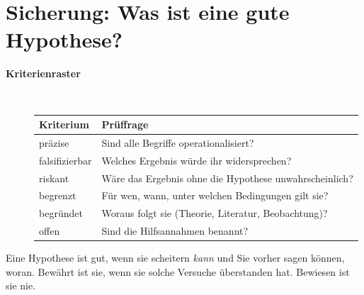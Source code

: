 \section{Sicherung: Was ist eine gute Hypothese?}
\begin{description}
\item[{\rot\bf Kriterienraster}]~\\[-\lblskip]
\begin{center}
\renewcommand{\arraystretch}{1.2}
\begin{tabular}{p{}p{}}
\toprule
\textbf{Kriterium} & \textbf{Prüffrage} \\
\midrule
präzise & Sind alle Begriffe operationalisiert? \\
falsifizierbar & Welches Ergebnis würde ihr widersprechen? \\
riskant & Wäre das Ergebnis ohne die Hypothese unwahrscheinlich? \\
begrenzt & Für wen, wann, unter welchen Bedingungen gilt sie? \\
begründet & Woraus folgt sie (Theorie, Literatur, Beobachtung)? \\
offen & Sind die Hilfsannahmen benannt? \\
\bottomrule
\end{tabular}
\end{center}
\os{\newpage}
\end{description}

\begin{merkbox}
Eine Hypothese ist gut, wenn sie scheitern \emph{kann} und Sie vorher
sagen können, woran. Bewährt ist sie, wenn sie solche Versuche
überstanden hat. Bewiesen ist sie nie.
\end{merkbox}
\os{\newpage}

